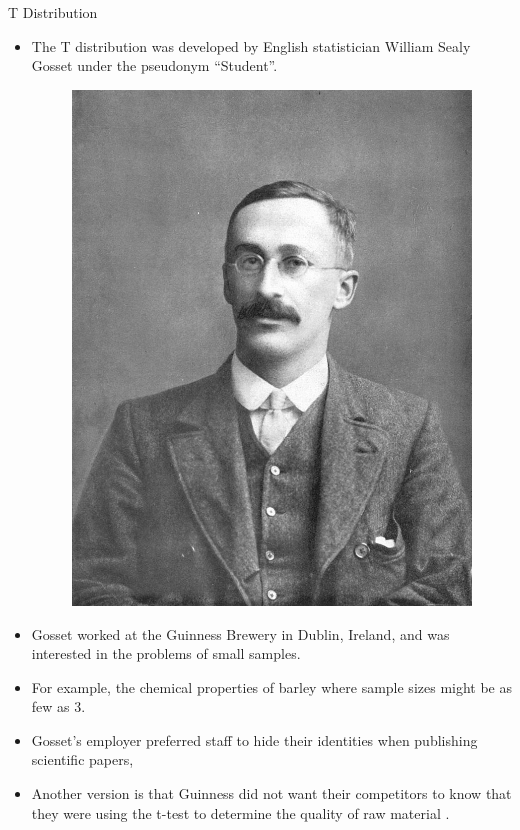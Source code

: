 \documentclass[handout]{beamer}
\begin{document}
\begin{frame}{T Distribution}
\scriptsize{
\begin{itemize}
 \item The T distribution was developed by English statistician William Sealy Gosset under the pseudonym ``Student''.
 
  \begin{figure}[h!]
	\centering
	\includegraphics[scale=0.6]{pics/William_Sealy_Gosset.jpg}
\end{figure}
 
 \item Gosset worked at the Guinness Brewery in Dublin, Ireland, and was interested in the problems of small samples.
 
 \item For example, the chemical properties of barley where sample sizes might be as few as 3.
 
 \item Gosset's employer preferred staff to hide their identities  when publishing scientific papers,
 
 \item Another version is that Guinness did not want their competitors to know that they were using the t-test to determine the quality of raw material \cite{wiki:Student's_t-distribution}.

\end{itemize}







} 
\end{frame}
\end{document}
